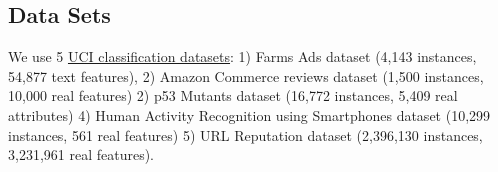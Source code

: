
\subsection{Data Sets}

We use 5 \href{http://archive.ics.uci.edu/ml/datasets.html}{UCI classification
datasets}: 1) Farms Ads dataset (4,143 instances, 54,877 text features), 2)
Amazon Commerce reviews dataset (1,500 instances, 10,000 real features) 2) p53
Mutants dataset (16,772 instances, 5,409 real attributes) 4) Human Activity
Recognition using Smartphones dataset (10,299 instances, 561 real features) 5)
URL Reputation dataset (2,396,130 instances, 3,231,961 real features).
